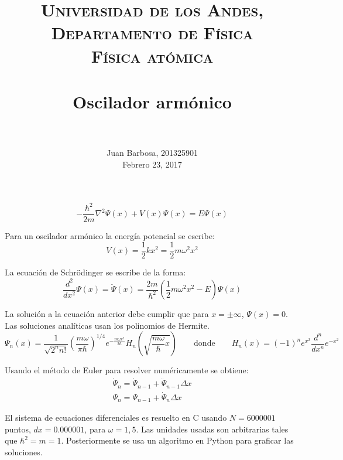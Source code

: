\documentclass[paper=letter, fontsize=11pt]{scrartcl}
\title{
        \usefont{OT1}{bch}{b}{n}
        \normalfont \normalsize \textsc{Universidad de los Andes, Departamento de F\'isica \\
        F\'isica at\'omica} \\ [25pt]
        \horrule{0.5pt} \\[0.4cm]
        \huge Oscilador arm\'onico \\
        \horrule{2pt} \\[0.5cm]
}
\author{
        \normalfont                                 \normalsize
        Juan Barbosa, 201325901\\[-3pt]      \normalsize
        Febrero 23, 2017
}
\date{}
\begin{document}
\maketitle

\[
\boxed{-\dfrac{\hbar^2}{2m}\nabla^2\Psi(x) + V(x)\Psi(x) = E\Psi(x)}
\]

Para un oscilador arm\'onico la energ\'ia potencial se escribe:
\begin{equation}
	V(x) = \dfrac{1}{2}kx^2 = \dfrac{1}{2}m\omega^2x^2
\end{equation}

La ecuaci\'on de Schr\"odinger se escribe de la forma:
\begin{equation}
	\dfrac{d^2}{dx^2}\Psi(x) = \ddot{\Psi}(x) =  \dfrac{2m}{\hbar^2}\left(\dfrac{1}{2}m\omega^2x^2-E\right)\Psi(x)
\end{equation}

La soluci\'on a la ecuaci\'on anterior debe cumplir que para $x = \pm\infty$, $\Psi(x) = 0$. Las soluciones anal\'iticas usan los polinomios de Hermite.
\begin{equation}
	\Psi_n(x) = \dfrac{1}{\sqrt{2^nn!}}\left(\dfrac{m\omega}{\pi\hbar}\right)^{1/4}e^{-\frac{m\omega x^2}{2\hbar}}H_n\left(\sqrt{\dfrac{m\omega}{\hbar}x}\right)
	\qquad \text{donde} \qquad	H_n(x) = (-1)^ne^{x^2}\dfrac{d^n}{dx^n}e^{-x^2}
\end{equation}

Usando el m\'etodo de Euler para resolver num\'ericamente se obtiene:
\begin{equation}
	\begin{matrix}
	\dot{\Psi}_n = \dot{\Psi}_{n-1} + \ddot{\Psi}_{n-1}\Delta x \\
	\Psi_n = \Psi_{n-1} + \dot{\Psi}_n\Delta x
	\end{matrix}
\end{equation}

El sistema de ecuaciones diferenciales es resuelto en C usando $N = 6000001$ puntos, $dx = 0.000001$, para $\omega = {1, 5}$. Las unidades usadas son arbitrarias tales que $\hbar^2 = m = 1$. Posteriormente se usa un algoritmo en Python para graficar las soluciones.
\end{document}
